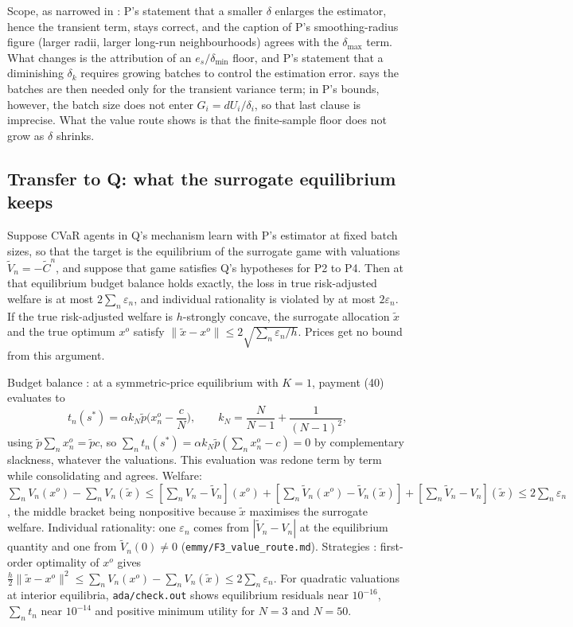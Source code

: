\documentclass{article}
\begin{document}
Scope, as narrowed in : P's statement that a smaller \(\delta\) enlarges the estimator, hence the transient term, stays correct, and the caption of P's smoothing-radius figure (larger radii, larger long-run neighbourhoods) agrees with the \(\delta_{\max}\) term. What changes is the attribution of an \(e_s/\delta_{\min}\) floor, and P's statement that a diminishing \(\delta_k\) requires growing batches to control the estimation error.  says the batches are then needed only for the transient variance term; in P's bounds, however, the batch size does not enter \(G_i=dU_i/\delta_i\), so that last clause is imprecise. What the value route shows is that the finite-sample floor does not grow as \(\delta\) shrinks.

\subsection{Transfer to Q: what the surrogate equilibrium keeps}

\begin{claim}
Suppose CVaR agents in Q's mechanism learn with P's estimator at fixed batch sizes, so that the target is the equilibrium of the surrogate game with valuations \(\widetilde V_n=-\widetilde C^n\), and suppose that game satisfies Q's hypotheses for P2 to P4. Then at that equilibrium budget balance holds exactly, the loss in true risk-adjusted welfare is at most \(2\sum_n\varepsilon_n\), and individual rationality is violated by at most \(2\varepsilon_n\). If the true risk-adjusted welfare is \(h\)-strongly concave, the surrogate allocation \(\tilde x\) and the true optimum \(x^o\) satisfy \(\|\tilde x-x^o\|\le2\sqrt{\sum_n\varepsilon_n/h}\). Prices get no bound from this argument. 
\end{claim}

Budget balance : at a symmetric-price equilibrium with \(K=1\), payment (40) evaluates to
\[
t_n(s^\ast)=\alpha k_N\tilde p\Big(x_n^o-\frac cN\Big),\qquad k_N=\frac{N}{N-1}+\frac{1}{(N-1)^2},
\]
using \(\tilde p\sum_nx_n^o=\tilde pc\), so \(\sum_nt_n(s^\ast)=\alpha k_N\tilde p(\sum_nx_n^o-c)=0\) by complementary slackness, whatever the valuations. This evaluation was redone term by term while consolidating and agrees. Welfare: \(\sum_nV_n(x^o)-\sum_nV_n(\tilde x)\le[\sum_nV_n-\widetilde V_n](x^o)+[\sum_n\widetilde V_n(x^o)-\widetilde V_n(\tilde x)]+[\sum_n\widetilde V_n-V_n](\tilde x)\le2\sum_n\varepsilon_n\), the middle bracket being nonpositive because \(\tilde x\) maximises the surrogate welfare. Individual rationality: one \(\varepsilon_n\) comes from \(|\widetilde V_n-V_n|\) at the equilibrium quantity and one from \(\widetilde V_n(0)\neq0\) (\texttt{emmy/F3\_value\_route.md}). Strategies : first-order optimality of \(x^o\) gives \(\tfrac h2\|\tilde x-x^o\|^2\le\sum_nV_n(x^o)-\sum_nV_n(\tilde x)\le2\sum_n\varepsilon_n\). For quadratic valuations at interior equilibria, \texttt{ada/check.out} shows equilibrium residuals near \(10^{-16}\), \(\sum_nt_n\) near \(10^{-14}\) and positive minimum utility for \(N=3\) and \(N=50\).
\end{document}
